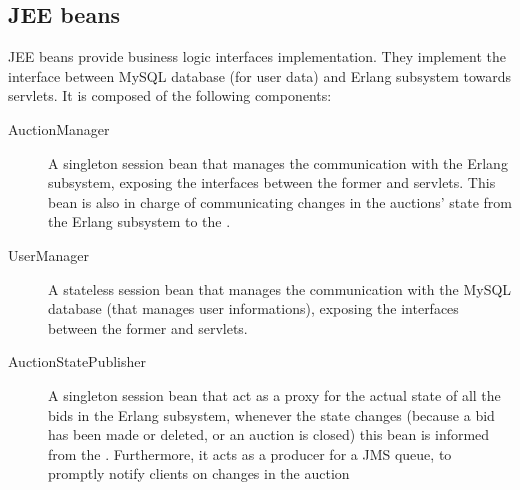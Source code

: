 \subsection{JEE beans}\label{subsec:archjee}

JEE beans provide business logic interfaces implementation. They implement the
interface between MySQL database (for user data) and Erlang subsystem towards
servlets. It is composed of the following components:

\begin{description}
	\item[AuctionManager] A singleton session bean that manages the
		communication with the Erlang subsystem, exposing the interfaces
		between the former and servlets. This bean is also in charge of
		communicating changes in the auctions’ state from the Erlang
		subsystem to the .
	\item[UserManager] A stateless session bean that manages the
		communication with the MySQL database (that manages user
		informations), exposing the interfaces between the former and
		servlets.
	\item[AuctionStatePublisher] A singleton session bean that act as a
		proxy for the actual state of all the bids in the Erlang
		subsystem, whenever the state changes (because a bid has been
		made or deleted, or an auction is closed) this bean is informed
		from the . Furthermore, it acts as a
		producer for a JMS queue, to promptly notify clients on changes
		in the auction
\end{description}
